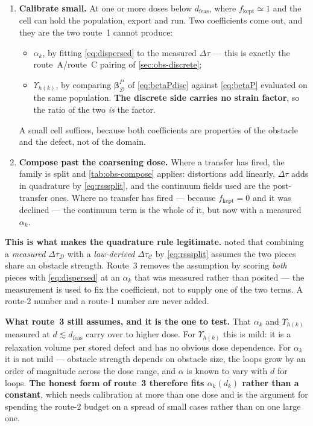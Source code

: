\documentclass{article}
\begin{document}
\begin{enumerate}
\item \textbf{Calibrate small.} At one or more doses below $d_{\mathrm{feas}}$,
      where $f_{\mathrm{kept}}\simeq1$ and the cell can hold the population,
      export and run. Two coefficients come out, and they are the two route~1
      cannot produce:
      \begin{itemize}
      \item $\alpha_k$, by fitting \cref{eq:dispersed} to the measured
            $\Delta\tau$ --- this is exactly the route~A/route~C pairing of
            \cref{sec:obs-discrete};
      \item $\Upsilon_{h(k)}$, by comparing $\bm\beta^{P}_{\mathcal D}$ of
            \cref{eq:betaPdisc} against \cref{eq:betaP} evaluated on the same
            population. \textbf{The discrete side carries no strain factor}, so
            the ratio of the two \emph{is} the factor.
      \end{itemize}
      A small cell suffices, because both coefficients are properties of the
      obstacle and the defect, not of the domain.
\item \textbf{Compose past the coarsening dose.} Where a transfer has fired, the
      family is split and \cref{tab:obs-compose} applies: distortions add
      linearly, $\Delta\tau$ adds in quadrature by \cref{eq:rsssplit}, and the
      continuum fields used are the post-transfer ones. Where no transfer has
      fired --- because $f_{\mathrm{kept}}=0$ and it was declined --- the
      continuum term is the whole of it, but now with a measured $\alpha_k$.
\end{enumerate}

\textbf{This is what makes the quadrature rule legitimate.}
 noted that combining a \emph{measured}
$\Delta\tau_{\mathcal D}$ with a \emph{law-derived} $\Delta\tau_{\mathcal C}$ by
\cref{eq:rsssplit} assumes the two pieces share an obstacle strength. Route~3
removes the assumption by scoring \emph{both} pieces with \cref{eq:dispersed} at
an $\alpha_k$ that was measured rather than posited --- the measurement is used
to fix the coefficient, not to supply one of the two terms. A route-2 number and
a route-1 number are never added.

\textbf{What route~3 still assumes, and it is the one to test.} That $\alpha_k$
and $\Upsilon_{h(k)}$ measured at $d\lesssim d_{\mathrm{feas}}$ carry over to
higher dose. For $\Upsilon_{h(k)}$ this is mild: it is a relaxation volume per
stored defect and has no obvious dose dependence. For $\alpha_k$ it is not mild
--- obstacle strength depends on obstacle size, the loops grow by an order of
magnitude across the dose range, and $\alpha$ is known to vary with $d$ for
loops. \textbf{The honest form of route~3 therefore fits $\alpha_k(d_k)$ rather
than a constant}, which needs calibration at more than one dose and is the
argument for spending the route-2 budget on a spread of small cases rather than
on one large one.
\end{document}
